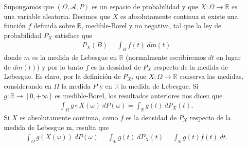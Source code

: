 \begin{ejemplo}
Supongamos que $(\Omega, \mathcal{A}, P)$ es un espacio de probabilidad y que $X: \Omega \longrightarrow \mathbb{R}$ es una variable aleatoria. Decimos que $X$ es absolutamente continua si existe una función $f$ definida sobre $\mathbb{R}$, medible-Borel y no negativa, tal que la ley de probabilidad $P_X$ satisface que
\begin{align*}
    P_X(B) = \int_{B}{f(t) \ dm(t)}
\end{align*}
donde $m$ es la medida de Lebesgue en $\mathbb{R}$ (normalmente escribiremos $dt$ en lugar de $dm(t)$) y por lo tanto $f$ es la dessidad de $P_X$ respecto de la medida de Lebesgue. Es claro, por la definición de $P_X$, que $X: \Omega \longrightarrow \mathbb{R}$ conserva las medidas, considerando en $\Omega$ la medida $P$ y en $\mathbb{R}$ la medida de Lebesgue. Si $g: \mathbb{R} \longrightarrow [0,+\infty]$ es medible-Borel, los resultados anteriores nos dicen que
\begin{align*}
    \int_{\Omega}{g \circ X(\omega) \ dP(\omega)} = \int_{\mathbb{R}}{g(t) \ dP_X(t)}.
\end{align*}
Si $X$ es absolutamente continua, como $f$ es la densidad de $P_X$ respecto de la medida de Lebesgue m, resulta que
\begin{align*}
    \int_{\Omega}{g(X(\omega)) \ dP(\omega)} = \int_{\mathbb{R}}{g(t) \ dP_X(t)} = \int_{\mathbb{R}}{g(t)f(t) \ dt}.
\end{align*}
\end{ejemplo}


